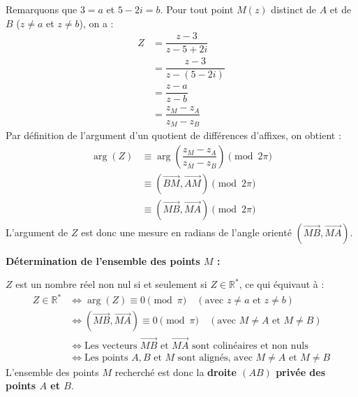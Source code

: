 \documentclass[12pt,a4paper]{article}
\begin{document}
\begin{enumerate}
\begin{enumerate}
        Remarquons que $3 = a$ et $5 - 2i = b$. Pour tout point $M(z)$ distinct de $A$ et de $B$ ($z \neq a$ et $z \neq b$), on a :
        $$
        \begin{aligned}
            Z &= \dfrac{z - 3}{z - 5 + 2i} \\
            &= \dfrac{z - 3}{z - (5 - 2i)} \\
            &= \dfrac{z - a}{z - b} \\
            &= \dfrac{z_M - z_A}{z_M - z_B}
        \end{aligned}
        $$
        Par définition de l'argument d'un quotient de différences d'affixes, on obtient :
        $$
        \begin{aligned}
            \arg(Z) &\equiv \arg\left( \dfrac{z_M - z_A}{z_M - z_B} \right) \pmod{2\pi} \\
            &\equiv \left( \overrightarrow{BM}, \overrightarrow{AM} \right) \pmod{2\pi} \\
            &\equiv \left( \overrightarrow{MB}, \overrightarrow{MA} \right) \pmod{2\pi}
        \end{aligned}
        $$
        L'argument de $Z$ est donc une mesure en radians de l'angle orienté $\left( \overrightarrow{MB}, \overrightarrow{MA} \right)$.
        
        \medskip
        \textbf{Détermination de l'ensemble des points $M$ :}
        
        $Z$ est un nombre réel non nul si et seulement si $Z \in \mathbb{R}^*$, ce qui équivaut à :
        $$
        \begin{aligned}
            Z \in \mathbb{R}^* &\iff \arg(Z) \equiv 0 \pmod{\pi} \quad (\text{avec } z \neq a \text{ et } z \neq b) \\
            &\iff \left( \overrightarrow{MB}, \overrightarrow{MA} \right) \equiv 0 \pmod{\pi} \quad (\text{avec } M \neq A \text{ et } M \neq B) \\
            &\iff \text{Les vecteurs } \overrightarrow{MB} \text{ et } \overrightarrow{MA} \text{ sont colinéaires et non nuls} \\
            &\iff \text{Les points } A, B \text{ et } M \text{ sont alignés, avec } M \neq A \text{ et } M \neq B
        \end{aligned}
        $$
        L'ensemble des points $M$ recherché est donc la \textbf{droite $(AB)$ privée des points $A$ et $B$}.
    \end{enumerate}
\end{enumerate}
\end{document}
